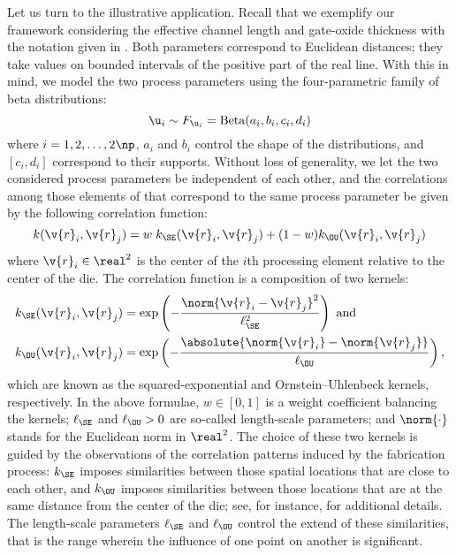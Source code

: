 Let us turn to the illustrative application. Recall that we exemplify our
framework considering the effective channel length and gate-oxide thickness with
the notation given in . Both parameters
correspond to Euclidean distances; they take values on bounded intervals of the
positive part of the real line. With this in mind, we model the two process
parameters using the four-parametric family of beta distributions:
\[
  \u_i \sim F_{\u_i} = \mathrm{Beta}(a_i, b_i, c_i, d_i)
\]
where $i = 1, 2, \dots, 2 \np$, $a_i$ and $b_i$ control the shape of the
distributions, and $[c_i, d_i]$ correspond to their supports. Without loss of
generality, we let the two considered process parameters be independent of each
other, and the correlations among those elements of \vu that correspond to the
same process parameter be given by the following correlation function:
\[
  k(\v{r}_i, \v{r}_j) = w \; k_\SE(\v{r}_i, \v{r}_j) + (1 - w) k_\OU(\v{r}_i, \v{r}_j)
\]
where $\v{r}_i \in \real^2$ is the center of the $i$th processing element
relative to the center of the die. The correlation function is a composition of
two kernels:
\begin{align*}
  & k_\SE(\v{r}_i, \v{r}_j) = \exp\left(- \frac{\norm{\v{r}_i - \v{r}_j}^2}{\ell_\SE^2} \right) \text{ and} \\
  & k_\OU(\v{r}_i, \v{r}_j) = \exp\left(- \frac{\absolute{\norm{\v{r}_i} - \norm{\v{r}_j}}}{\ell_\OU} \right),
\end{align*}
which are known as the squared-exponential and Ornstein--Uhlenbeck kernels,
respectively. In the above formulae, $w \in [0, 1]$ is a weight coefficient
balancing the kernels; $\ell_\SE$ and $\ell_\OU > 0$ are so-called length-scale
parameters; and $\norm{\cdot}$ stands for the Euclidean norm in $\real^2$. The
choice of these two kernels is guided by the observations of the correlation
patterns induced by the fabrication process: $k_\SE$ imposes similarities
between those spatial locations that are close to each other, and $k_\OU$
imposes similarities between those locations that are at the same distance from
the center of the die; see, for instance, \cite{friedberg2005} for additional
details. The length-scale parameters $\ell_\SE$ and $\ell_\OU$ control the
extend of these similarities, that is the range wherein the influence of one
point on another is significant.
